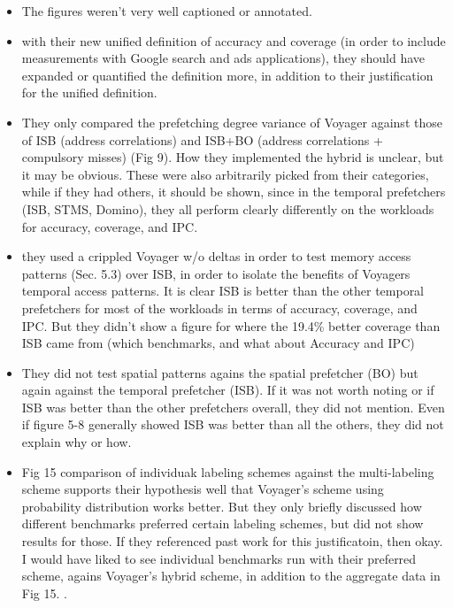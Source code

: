 \documentclass [12pt]{article}
\begin{document}
        \begin{itemize}
            \item The figures weren't very well captioned or annotated. 
            \item with their new unified definition of accuracy and coverage (in order to include measurements with Google search and ads applications), they should have expanded or quantified the definition more, in addition to their justification for the unified definition. 
            \item They only compared the prefetching degree variance of Voyager against those of ISB (address correlations) and ISB+BO (address correlations + compulsory misses) (Fig 9). How they implemented the hybrid is unclear, but it may be obvious. These were also arbitrarily picked from their categories, while if they had others, it should be shown, since in the temporal prefetchers (ISB, STMS, Domino), they all perform clearly differently on the workloads for accuracy, coverage, and IPC.
            \item they used a crippled Voyager w/o deltas in order to test memory access patterns (Sec. 5.3) over ISB, in order to isolate the benefits of Voyagers temporal access patterns. It is clear ISB is better than the other temporal prefetchers for most of the workloads in terms of accuracy, coverage, and IPC. But they didn't show a figure for where the 19.4\% better coverage than ISB came from (which benchmarks, and what about Accuracy and IPC)
            \item They did not test spatial patterns agains the spatial prefetcher (BO) but again against the temporal prefetcher (ISB). If it was not worth noting or if ISB was better than the other prefetchers overall, they did not mention. Even if figure 5-8 generally showed ISB was better than all the others, they did not explain why or how. 
            \item Fig 15 comparison of individuak labeling schemes against the multi-labeling scheme supports their hypothesis well that Voyager's scheme using probability distribution works better. But they only briefly discussed how different benchmarks preferred certain labeling schemes, but did not show results for those. If they referenced past work for this justificatoin, then okay. I would have liked to see individual benchmarks run with their preferred scheme, agains Voyager's hybrid scheme, in addition to the aggregate data in Fig 15. . 
        \end{itemize}
\end{document}
